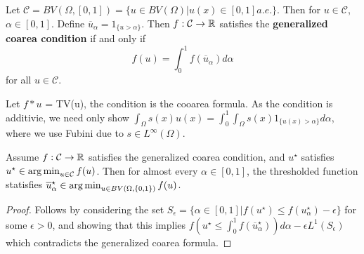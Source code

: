 \begin{defn}
  Let $\mathcal{C} = BV(\Omega, [0, 1]) = \{ u \in BV(\Omega) | u(x)
  \in [0, 1] a.e. \}$.  Then for $u \in \mathcal{C}$, $\alpha \in [0,
  1]$.  Define $\overline u_{\alpha} = 1_{\{ u > \alpha \} }$. Then
  $f: \mathcal{C} \rightarrow \mathbb{R}$ satisfies the \textbf{generalized
    coarea condition} if and only if
  \begin{equation}
    \label{eq:59}
    f(u) = \int_{0}^{1} f(\overline u_{\alpha}) d\alpha
  \end{equation} for all $u \in \mathcal{C}$.
\end{defn}

\begin{thm}
  Let $f*u$ = TV(u), the condition is the cooarea formula.  As the
  condition is additivie, we need only show $\int_{\Omega} s(x) u(x)
  = \int_{0}^{1} \int_{\Omega} s(x) 1_{\{ u(x) > \alpha \}} d\alpha$,
  where we use Fubini due to $s \in L^{\infty}(\Omega)$.
\end{thm}

\begin{thm}
  Assume $f: \mathcal{C} \rightarrow \mathbb{R}$ satisfies the generalized
  coarea condition, and $u^{\star}$ satisfies $u^{\star} \in
  \operatorname*{arg\,min}_{u \in \mathcal{C}} f(u)$. Then for almost every $\alpha \in
  [0, 1]$, the thresholded function statisfies $\overline
  u_{\alpha}^{\star} \in \operatorname*{arg\,min}_{u \in BV(\Omega, \{ 0, 1 \})} f(u)$.
\end{thm}

\begin{proof}
  Follows by considering the set $S_{\epsilon} = \{ \alpha \in [0, 1]
  | f(u^{\star}) \leq f(u^{\star}_{\alpha}) - \epsilon \} $ for some
  $\epsilon > 0$, and showing that this implies $f(u^{\star} \leq
  \int_{0}^{1} f(\overline u_{\alpha}^{\star})) d\alpha - \epsilon
  L^{1}(S_{\epsilon})$ which contradicts the generalized coarea formula.
\end{proof}



